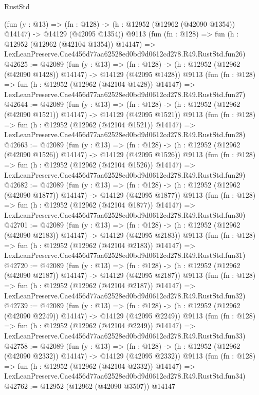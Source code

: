 \begin{lexlean}{RustStd}
\begin{coremodule}
    (fun (y : @13) =>
    (fn : @128) -> (h : @12952 (@12962 (@42090 @1354)) @14147) -> @14129 (@42095 @1354))
    @9113
    (fun (fn : @128) =>
    fun (h : @12952 (@12962 (@42104 @1354)) @14147) =>
    LexLeanPreserve.Cae4456d77aa62528ed0bd9d0612cd278.R49.RustStd.fun26)
@42625 := @42089
    (fun (y : @13) =>
    (fn : @128) -> (h : @12952 (@12962 (@42090 @1428)) @14147) -> @14129 (@42095 @1428))
    @9113
    (fun (fn : @128) =>
    fun (h : @12952 (@12962 (@42104 @1428)) @14147) =>
    LexLeanPreserve.Cae4456d77aa62528ed0bd9d0612cd278.R49.RustStd.fun27)
@42644 := @42089
    (fun (y : @13) =>
    (fn : @128) -> (h : @12952 (@12962 (@42090 @1521)) @14147) -> @14129 (@42095 @1521))
    @9113
    (fun (fn : @128) =>
    fun (h : @12952 (@12962 (@42104 @1521)) @14147) =>
    LexLeanPreserve.Cae4456d77aa62528ed0bd9d0612cd278.R49.RustStd.fun28)
@42663 := @42089
    (fun (y : @13) =>
    (fn : @128) -> (h : @12952 (@12962 (@42090 @1526)) @14147) -> @14129 (@42095 @1526))
    @9113
    (fun (fn : @128) =>
    fun (h : @12952 (@12962 (@42104 @1526)) @14147) =>
    LexLeanPreserve.Cae4456d77aa62528ed0bd9d0612cd278.R49.RustStd.fun29)
@42682 := @42089
    (fun (y : @13) =>
    (fn : @128) -> (h : @12952 (@12962 (@42090 @1877)) @14147) -> @14129 (@42095 @1877))
    @9113
    (fun (fn : @128) =>
    fun (h : @12952 (@12962 (@42104 @1877)) @14147) =>
    LexLeanPreserve.Cae4456d77aa62528ed0bd9d0612cd278.R49.RustStd.fun30)
@42701 := @42089
    (fun (y : @13) =>
    (fn : @128) -> (h : @12952 (@12962 (@42090 @2183)) @14147) -> @14129 (@42095 @2183))
    @9113
    (fun (fn : @128) =>
    fun (h : @12952 (@12962 (@42104 @2183)) @14147) =>
    LexLeanPreserve.Cae4456d77aa62528ed0bd9d0612cd278.R49.RustStd.fun31)
@42720 := @42089
    (fun (y : @13) =>
    (fn : @128) -> (h : @12952 (@12962 (@42090 @2187)) @14147) -> @14129 (@42095 @2187))
    @9113
    (fun (fn : @128) =>
    fun (h : @12952 (@12962 (@42104 @2187)) @14147) =>
    LexLeanPreserve.Cae4456d77aa62528ed0bd9d0612cd278.R49.RustStd.fun32)
@42739 := @42089
    (fun (y : @13) =>
    (fn : @128) -> (h : @12952 (@12962 (@42090 @2249)) @14147) -> @14129 (@42095 @2249))
    @9113
    (fun (fn : @128) =>
    fun (h : @12952 (@12962 (@42104 @2249)) @14147) =>
    LexLeanPreserve.Cae4456d77aa62528ed0bd9d0612cd278.R49.RustStd.fun33)
@42758 := @42089
    (fun (y : @13) =>
    (fn : @128) -> (h : @12952 (@12962 (@42090 @2332)) @14147) -> @14129 (@42095 @2332))
    @9113
    (fun (fn : @128) =>
    fun (h : @12952 (@12962 (@42104 @2332)) @14147) =>
    LexLeanPreserve.Cae4456d77aa62528ed0bd9d0612cd278.R49.RustStd.fun34)
@42762 := @12952 (@12962 (@42090 @3507)) @14147

\end{coremodule}
\end{lexlean}

